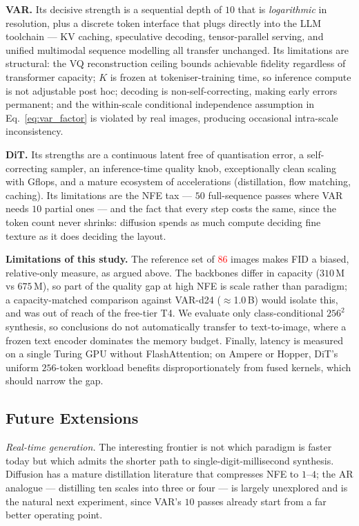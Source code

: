 \documentclass[conference]{IEEEtran}
\newcommand{\R}[1]{\textcolor{red}{#1}}
\begin{document}
\textbf{VAR.} Its decisive strength is a sequential depth of $10$ that is
\emph{logarithmic} in resolution, plus a discrete token interface that plugs directly into
the LLM toolchain --- KV caching, speculative decoding, tensor-parallel serving, and
unified multimodal sequence modelling all transfer unchanged. Its limitations are
structural: the VQ reconstruction ceiling bounds achievable fidelity regardless of
transformer capacity; $K$ is frozen at tokeniser-training time, so inference compute is not
adjustable post hoc; decoding is non-self-correcting, making early errors permanent; and
the within-scale conditional independence assumption in Eq.~\eqref{eq:var_factor} is
violated by real images, producing occasional intra-scale inconsistency.

\textbf{DiT.} Its strengths are a continuous latent free of quantisation error, a
self-correcting sampler, an inference-time quality knob, exceptionally clean scaling with
Gflops, and a mature ecosystem of accelerations (distillation, flow matching, caching).
Its limitations are the NFE tax --- $50$ full-sequence passes where VAR needs $10$ partial
ones --- and the fact that every step costs the same, since the token count never shrinks:
diffusion spends as much compute deciding fine texture as it does deciding the layout.

\textbf{Limitations of this study.} The reference set of \R{86} images makes FID a biased,
relative-only measure, as argued above. The backbones differ in capacity ($310$\,M vs
$675$\,M), so part of the quality gap at high NFE is scale rather than paradigm; a
capacity-matched comparison against VAR-d24 ($\approx$1.0\,B) would isolate this, and was
out of reach of the free-tier T4. We evaluate only class-conditional $256^2$ synthesis, so
conclusions do not automatically transfer to text-to-image, where a frozen text encoder
dominates the memory budget. Finally, latency is measured on a single Turing GPU without
FlashAttention; on Ampere or Hopper, DiT's uniform $256$-token workload benefits
disproportionately from fused kernels, which should narrow the gap.

\subsection{Future Extensions}

\emph{Real-time generation.} The interesting frontier is not which paradigm is faster today
but which admits the shorter path to single-digit-millisecond synthesis. Diffusion has a
mature distillation literature that compresses NFE to $1$--$4$; the AR analogue ---
distilling ten scales into three or four --- is largely unexplored and is the natural next
experiment, since VAR's $10$ passes already start from a far better operating point.
\end{document}
